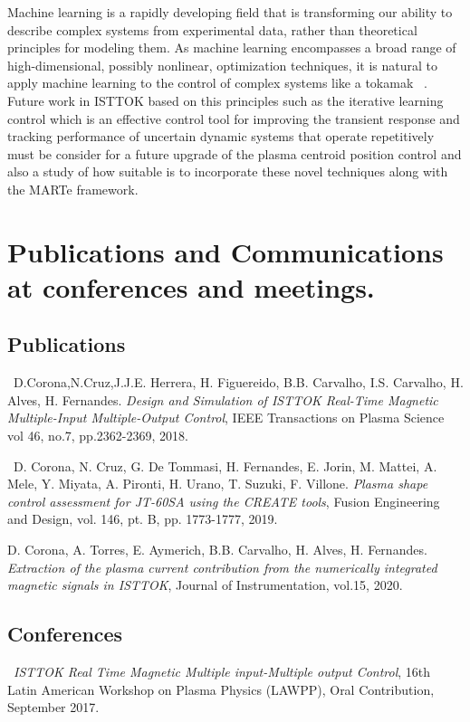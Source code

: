 Machine learning is a rapidly developing field that is transforming our ability to describe complex systems from experimental data, rather than theoretical principles for modeling them. As machine learning encompasses a broad range of high-dimensional, possibly nonlinear, optimization techniques, it is natural to apply machine learning to the control of complex systems like a tokamak ~\cite[Chapter~10]{DataDriven2019}. Future work in ISTTOK based on this principles such as the iterative learning control which is an effective control tool for improving the transient response and tracking performance of uncertain dynamic systems that operate repetitively~\cite{Ahn2007}  must be consider for a future upgrade of the plasma centroid position control and also a study of how suitable is to incorporate these novel techniques along with the MARTe framework.

\section{Publications and Communications at conferences and meetings. }

\subsection{Publications}
\textbullet \, D.Corona,N.Cruz,J.J.E. Herrera, H. Figuereido, B.B. Carvalho, I.S. Carvalho, H. Alves, H. Fernandes. \textit{Design and Simulation of ISTTOK Real-Time Magnetic Multiple-Input Multiple-Output Control}, IEEE Transactions on Plasma Science vol 46, no.7, pp.2362-2369, 2018.
\smallskip

\textbullet \, D. Corona, N. Cruz, G. De Tommasi, H. Fernandes, E. Jorin, M. Mattei, A. Mele, Y. Miyata, A. Pironti, H. Urano, T. Suzuki, F. Villone.\textit{ Plasma shape control assessment for JT-60SA using the CREATE tools}, Fusion Engineering and Design, vol. 146, pt. B, pp. 1773-1777, 2019.
\smallskip

\textbullet D. Corona, A. Torres, E. Aymerich, B.B. Carvalho, H. Alves, H. Fernandes. \textit{Extraction of the plasma current contribution from the numerically integrated magnetic signals in ISTTOK}, Journal of Instrumentation, vol.15, 2020.
\smallskip

\subsection{Conferences}

\textbullet \, \textit{ISTTOK Real Time Magnetic Multiple input-Multiple output Control}, 16th Latin American Workshop on Plasma Physics (LAWPP), Oral Contribution, September 2017.
\smallskip

